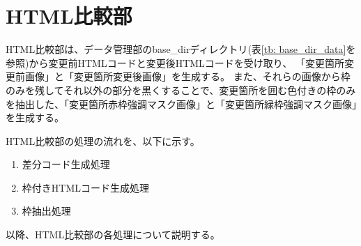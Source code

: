 \section{HTML比較部}\label{sec:Affected_area_extraction}
HTML比較部は、データ管理部のbase\_dirディレクトリ(表\ref{tb: base_dir_data}を参照)から変更前HTMLコードと変更後HTMLコードを受け取り、
「変更箇所変更前画像」と「変更箇所変更後画像」を生成する。
また、それらの画像から枠のみを残してそれ以外の部分を黒くすることで、変更箇所を囲む色付きの枠のみを抽出した、「変更箇所赤枠強調マスク画像」と「変更箇所緑枠強調マスク画像」を生成する。
\par
HTML比較部の処理の流れを、以下に示す。
\begin{enumerate}
    \item 差分コード生成処理
    \item 枠付きHTMLコード生成処理
    \item 枠抽出処理
\end{enumerate}
\par
以降、HTML比較部の各処理について説明する。

